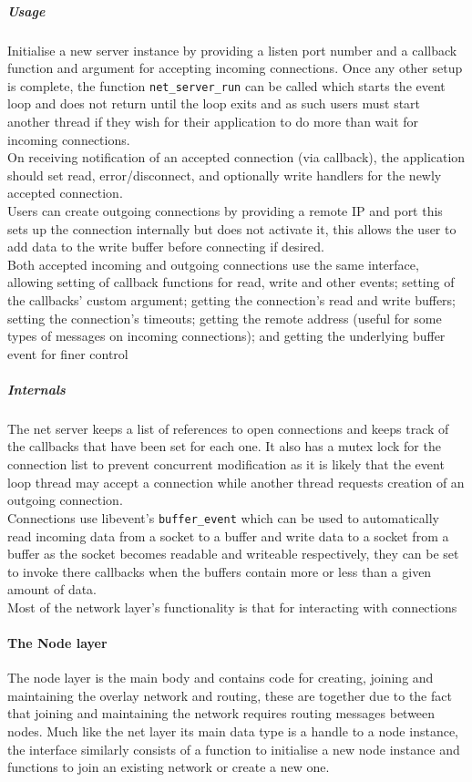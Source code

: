 \documentclass{article}
\begin{document}
\subparagraph{Usage}
Initialise a new server instance by providing a listen port number and a callback function and argument for accepting incoming connections. Once any other setup is complete, the function \texttt{net\_server\_run} can be called which starts the event loop and does not return until the loop exits and as such users must start another thread if they wish for their application to do more than wait for incoming connections.
\\
On receiving notification of an accepted connection (via callback), the application should set read, error/disconnect, and optionally write handlers for the newly accepted connection.
\\
Users can create outgoing connections by providing a remote IP and port this sets up the connection internally but does not activate it, this allows the user to add data to the write buffer before connecting if desired.
\\
Both accepted incoming and outgoing connections use the same interface, allowing setting of callback functions for read, write and other events; setting of the callbacks' custom argument; getting the connection's read and write buffers; setting the connection's timeouts; getting the remote address (useful for some types of messages on incoming connections); and getting the underlying buffer event for finer control

\subparagraph{Internals}
The net server keeps a list of references to open connections and keeps track of the callbacks that have been set for each one. It also has a mutex lock for the connection list to prevent concurrent modification as it is likely that the event loop thread may accept a connection while another thread requests creation of an outgoing connection.
\\
Connections use libevent's \texttt{buffer\_event} which can be used to automatically read incoming data from a socket to a buffer and write data to a socket from a buffer as the socket becomes readable and writeable respectively, they can be set to invoke there callbacks when the buffers contain more or less than a given amount of data.
\\
Most of the network layer's functionality is that for interacting with connections

\paragraph{The Node layer}
The node layer is the main body and contains code for creating, joining and maintaining the overlay network  and routing, these are together due to the fact that joining and maintaining the network requires routing messages between nodes. Much like the net layer its main data type is a handle to a node instance, the interface similarly consists of a function to initialise a new node instance and functions to join an existing network or create a new one. 
\end{document}
